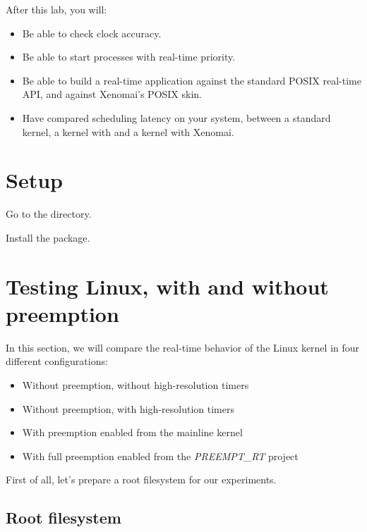 
After this lab, you will:
\begin{itemize}
\item Be able to check clock accuracy.
\item Be able to start processes with real-time priority.
\item Be able to build a real-time application against the standard
POSIX real-time API, and against Xenomai's POSIX skin.
\item Have compared scheduling latency on your system, between a
  standard kernel, a kernel with  and a kernel
  with Xenomai.
\end{itemize}

\section{Setup}

Go to the  directory.

Install the  package.

\section{Testing Linux, with and without preemption}

In this section, we will compare the real-time behavior of the Linux
kernel in four different configurations:

\begin{itemize}
\item Without preemption, without high-resolution timers
\item Without preemption, with high-resolution timers
\item With preemption enabled from the mainline kernel
\item With full preemption enabled from the {\em PREEMPT\_RT} project
\end{itemize}

First of all, let's prepare a root filesystem for our experiments.

\subsection{Root filesystem}

